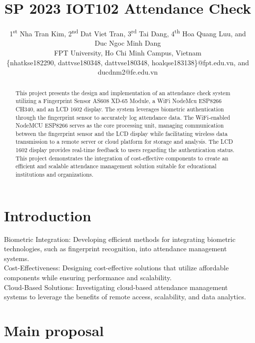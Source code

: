 \documentclass[conference, doublecolumn]{IEEEtran}
\begin{document}
\title{\textbf{SP 2023 IOT102 Attendance Check}\\}

\author{
1\textsuperscript{st} Nha Tran Kim, 2\textsuperscript{nd} Dat Viet Tran, 3\textsuperscript{rd} Tai Dang, 4\textsuperscript{th} Hoa Quang Luu, and Duc Ngoc Minh Dang\\
FPT University, Ho Chi Minh Campus, Vietnam\\
\{nhatkse182290, dattvse180348, dattvse180348, hoalqse183138\}@fpt.edu.vn, and ducdnm2@fe.edu.vn}
\maketitle

\begin{abstract}
This project presents the design and implementation of an attendance check system utilizing a Fingerprint Sensor AS608 XD-65 Module, a WiFi NodeMcu ESP8266 CH340, and an LCD 1602 display. The system leverages biometric authentication through the fingerprint sensor to accurately log attendance data. The WiFi-enabled NodeMCU ESP8266 serves as the core processing unit, managing communication between the fingerprint sensor and the LCD display while facilitating wireless data transmission to a remote server or cloud platform for storage and analysis. The LCD 1602 display provides real-time feedback to users regarding the authentication status. This project demonstrates the integration of cost-effective components to create an efficient and scalable attendance management solution suitable for educational institutions and organizations.
\end{abstract}

\section{\textbf{Introduction}}

Biometric Integration: Developing efficient methods for integrating biometric technologies, such as fingerprint recognition, into attendance management systems.\\
Cost-Effectiveness: Designing cost-effective solutions that utilize affordable components while ensuring performance and scalability.\\
Cloud-Based Solutions: Investigating cloud-based attendance management systems to leverage the benefits of remote access, scalability, and data analytics.



\section{\textbf{Main proposal}}
\end{document}
